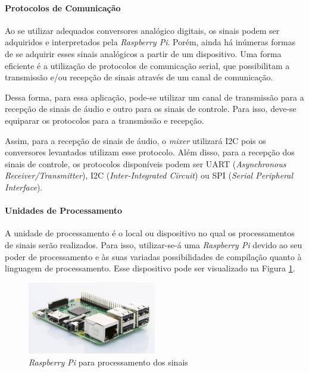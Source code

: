 \paragraph{Protocolos de Comunicação}
Ao se utilizar adequados conversores analógico digitais, os sinais podem ser adquiridos e interpretados pela \textit{Raspberry Pi}. Porém, ainda há inúmeras formas de se adquirir esses sinais analógicos a partir de um dispositivo. Uma forma eficiente é a utilização de protocolos de comunicação serial, que possibilitam a transmissão e/ou recepção de sinais através de um canal de comunicação.

Dessa forma, para essa aplicação, pode-se utilizar um canal de transmissão para a recepção de sinais de áudio e outro para os sinais de controle. Para isso, deve-se equiparar os protocolos para a transmissão e recepção.

Assim, para a recepção de sinais de áudio, o \textit{mixer} utilizará I2C pois os conversores levantados utilizam esse protocolo. Além disso, para a recepção dos sinais de controle, os protocolos disponíveis podem ser UART (\textit{Asynchronous Receiver/Transmitter}), I2C (\textit{Inter-Integrated Circuit}) ou SPI (\textit{Serial Peripheral Interface}).

\paragraph{Unidades de Processamento}

A unidade de processamento é o local ou dispositivo no qual os processamentos de sinais serão realizados. Para isso, utilizar-se-á uma \textit{Raspberry Pi} devido ao seu poder de processamento e às suas variadas possibilidades de compilação quanto à linguagem de processamento. Esse dispositivo pode ser visualizado na Figura \ref{fig65}.

\begin{figure}[h]
    \centering
    \includegraphics[width=0.5\textwidth]{figuras/fig65.jpg}
    \caption{\textit{Raspberry Pi} para processamento dos sinais \cite{adrenalineDisplaysLanar}}
    \label{fig65}
\end{figure}    

